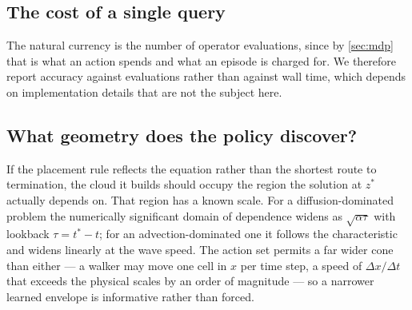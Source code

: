 \subsection{The cost of a single query}
\label{sec:results_cost}

The natural currency is the number of operator evaluations, since by
\cref{sec:mdp} that is what an action spends and what an episode is charged
for. We therefore report accuracy against evaluations rather than against wall
time, which depends on implementation details that are not the subject here.



\subsection{What geometry does the policy discover?}
\label{sec:results_geometry}

If the placement rule reflects the equation rather than the shortest route to
termination, the cloud it builds should occupy the region the solution at
$z^{*}$ actually depends on. That region has a known scale. For a
diffusion-dominated problem the numerically significant domain of dependence
widens as $\sqrt{\alpha\tau}$ with lookback $\tau = t^{*} - t$; for an
advection-dominated one it follows the characteristic and widens linearly at
the wave speed. The action set permits a far wider cone than either --- a walker
may move one cell in $x$ per time step, a speed of $\Delta x/\Delta t$ that
exceeds the physical scales by an order of magnitude --- so a narrower learned
envelope is informative rather than forced.

